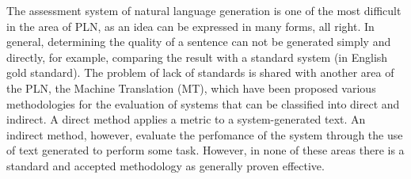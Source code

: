 
The assessment system of natural language generation is one of the most
difficult in the area of PLN, as an idea can be expressed in many forms, all
right. In general, determining the quality of a sentence can not be generated
simply and directly, for example, comparing the result with a standard system
(in English gold standard). The problem of lack of standards is shared with
another area of the PLN, the Machine Translation (MT), which have been proposed
various methodologies for the evaluation of systems that can be classified into
direct and indirect. A direct method applies a metric to a system-generated
text. An indirect method, however, evaluate the perfomance of the system through
the use of text generated to perform some task. However, in none of these areas
there is a standard and accepted methodology as generally proven effective.



